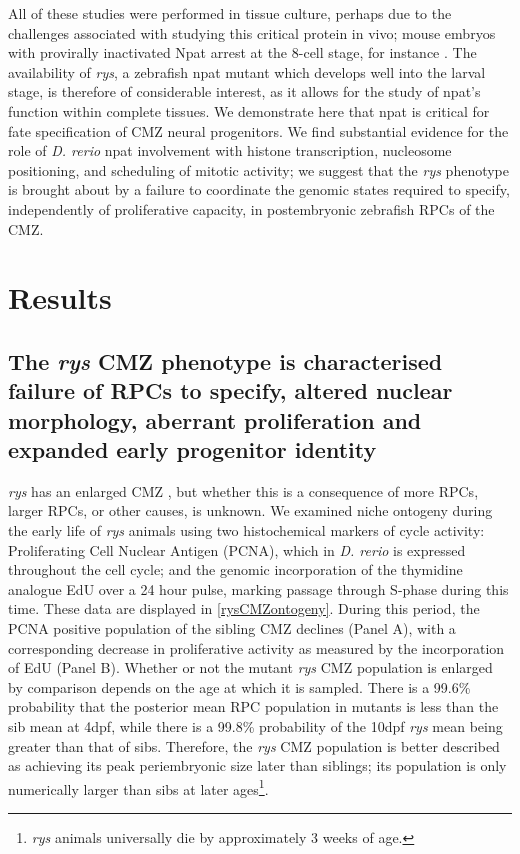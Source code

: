 All of these studies were performed in tissue culture, perhaps due to the challenges associated with studying this critical protein in vivo; mouse embryos with provirally inactivated Npat arrest at the 8-cell stage, for instance \cite{DiFruscio1997}. The availability of \textit{rys}, a zebrafish npat mutant which develops well into the larval stage, is therefore of considerable interest, as it allows for the study of npat’s function within complete tissues. We demonstrate here that npat is critical for fate specification of CMZ neural progenitors. We find substantial evidence for the role of \textit{D. rerio} npat involvement with histone transcription, nucleosome positioning, and scheduling of mitotic activity; we suggest that the \textit{rys} phenotype is brought about by a failure to coordinate the genomic states required to specify, independently of proliferative capacity, in postembryonic zebrafish RPCs of the CMZ.

\section{Results}
\subsection{The \textit{rys} CMZ phenotype is characterised failure of RPCs to specify, altered nuclear morphology, aberrant proliferation and expanded early progenitor identity}

\textit{rys} has an enlarged CMZ \cite{Wehman2005}, but whether this is a consequence of more RPCs, larger RPCs, or other causes, is unknown. We examined niche ontogeny during the early life of \textit{rys} animals using two histochemical markers of cycle activity: Proliferating Cell Nuclear Antigen (PCNA), which in \textit{D. rerio} is expressed throughout the cell cycle; and the genomic incorporation of the thymidine analogue EdU over a 24 hour pulse, marking passage through S-phase during this time. These data are displayed in \autoref{rysCMZontogeny}. During this period, the PCNA positive population of the sibling CMZ declines (Panel A), with a corresponding decrease in proliferative activity as measured by the incorporation of EdU (Panel B). Whether or not the mutant \textit{rys} CMZ population is enlarged by comparison depends on the age at which it is sampled. There is a 99.6\% probability that the posterior mean RPC population in mutants is less than the sib mean at 4dpf, while there is a 99.8\% probability of the 10dpf \textit{rys} mean being greater than that of sibs. Therefore, the \textit{rys} CMZ population is better described as achieving its peak periembryonic size later than siblings; its population is only numerically larger than sibs at later ages\footnote{\textit{rys} animals universally die by approximately 3 weeks of age.}. 

